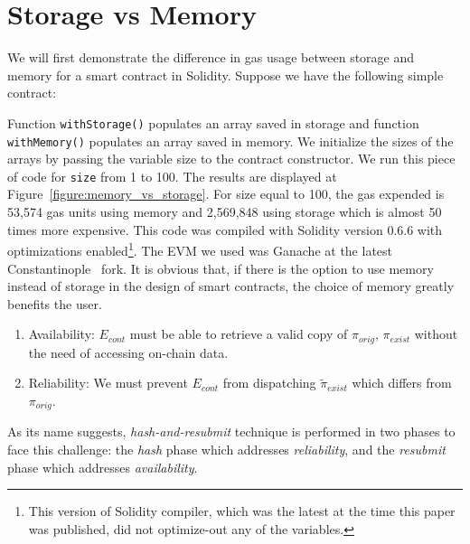 % 

\section{Storage vs Memory}

We will first demonstrate the difference in gas usage between storage and
memory for a smart contract in Solidity. Suppose we have the following simple
contract:



Function \texttt{withStorage()} populates an array saved in storage and
function \texttt{withMemory()} populates an array saved in memory. We
initialize the sizes of the arrays by passing the variable \textsf{size} to the
contract constructor. We run this piece of code for \texttt{size} from 1 to
100. The results are displayed at Figure~\ref{figure:memory_vs_storage}. For
\textsf{size} equal to 100, the gas expended is 53,574 gas units using memory
and 2,569,848 using storage which is almost 50 times more expensive. This code
was compiled with Solidity version 0.6.6 with optimizations
enabled\footnote{This version of Solidity compiler, which was the latest at the
time this paper was published, did not optimize-out any of the variables.}. The
EVM we used  was Ganache at the latest Constantinople~\cite{constantinople}
fork. It is obvious that, if there is the option to use memory instead of
storage in the design of smart contracts, the choice of memory greatly benefits
the user.




\begin{enumerate}

    \item Availability: $E_{cont}$ must be able to retrieve a valid copy of $\pi_{orig}$,
        $\pi_{exist}$ without the need of accessing on-chain data.

    \item Reliability: We must prevent $E_{cont}$ from dispatching
        $\tilde\pi_{exist}$ which differs from $\pi_{orig}$.

\end{enumerate}

As its name suggests, \emph{hash-and-resubmit} technique is performed in two
phases to face this challenge: the \emph{hash} phase which addresses
\emph{reliability}, and the \emph{resubmit} phase which addresses
\emph{availability}.

